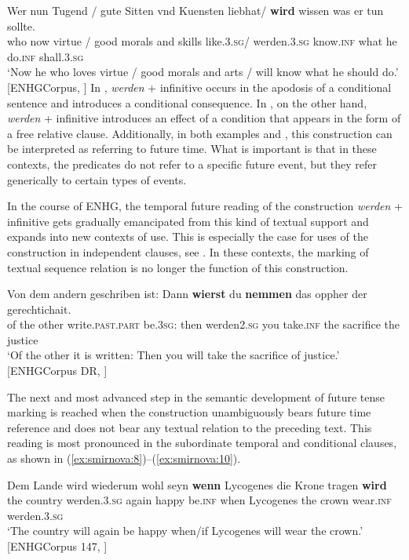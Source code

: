 \documentclass[output=paper,colorlinks,citecolor=brown]{langscibook}
\begin{document}
\ea\label{ex:smirnova:6}
\gll Wer nun Tugend / gute Sitten vnd Kuensten liebhat/ \textbf{wird} wissen was er tun sollte. \\
	 who now virtue / good morals and skills like.\textsc{3.sg}/ werden.\textsc{3.sg} know.\textsc{inf} what he do.\textsc{inf} shall.\textsc{3.sg}\\
\glt `Now he who loves virtue / good morals and arts / will know what he should do.'\\
\hfill [ENHGCorpus, \citet[263]{Smirnova2006}]
\z
In , \emph{werden} + infinitive occurs in the apodosis of a conditional sentence and introduces a conditional consequence. In , on the other hand, \emph{werden} + infinitive introduces an effect of a condition that appears in the form of a free relative clause. Additionally, in both examples  and , this construction can be interpreted as referring to future time. What is important is that in these contexts, the predicates do not refer to a specific future event, but they refer generically to certain types of events. 
\par In the course of ENHG, the temporal future reading of the construction \emph{werden} + infinitive gets gradually emancipated from this kind of textual support and expands into new contexts of use. This is especially the case for uses of the construction in independent clauses, see . In these contexts, the marking of textual sequence relation is no longer the function of this construction. 

\ea \label{ex:smirnova:7}
\gll Von dem andern geschriben ist: Dann \textbf{wierst} du \textbf{nemmen} das oppher der gerechtichait. \\
of the other write.\textsc{past.part} be.\textsc{3sg}: then werden\textsc{2.sg} you take.\textsc{inf} the sacrifice the justice\\
\glt `Of the other it is written: Then you will take the sacrifice of justice.'\\
\hfill [ENHGCorpus DR, \citet[261]{Smirnova2006}]
\z

The next and most advanced step in the semantic development of future tense marking is reached when the construction unambiguously bears future time reference and does not bear any textual relation to the preceding text. This reading is most pronounced in the subordinate temporal and conditional clauses, as shown in (\ref{ex:smirnova:8})--(\ref{ex:smirnova:10}). 

\ea \label{ex:smirnova:8}
\gll Dem Lande wird wiederum wohl seyn \textbf{wenn} Lycogenes die Krone tragen \textbf{wird} \\
	 the country werden.\textsc{3.sg} again happy be.\textsc{inf} when Lycogenes the crown wear.\textsc{inf} werden.\textsc{3.sg} \\
\glt `The country will again be happy when/if Lycogenes will wear the crown.'\\
\hfill [ENHGCorpus 147, \citet[301]{Smirnova2006}]
\z
\end{document}
